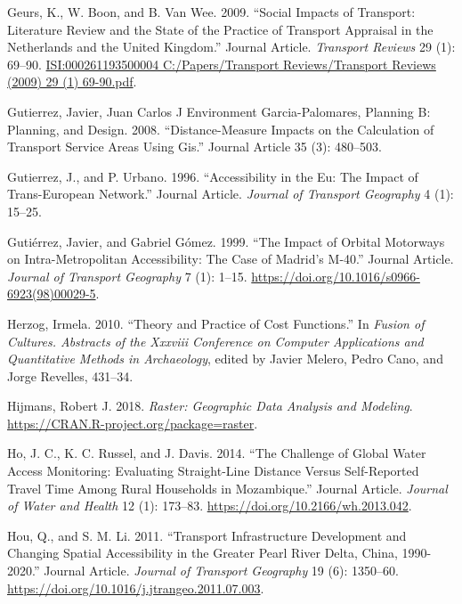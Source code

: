 \documentclass[]{elsarticle} %
\begin{document}
\leavevmode\hypertarget{ref-Geurs2009}{}%
Geurs, K., W. Boon, and B. Van Wee. 2009. ``Social Impacts of Transport:
Literature Review and the State of the Practice of Transport Appraisal
in the Netherlands and the United Kingdom.'' Journal Article.
\emph{Transport Reviews} 29 (1): 69--90.
\href{ISI:000261193500004\%0AC:/Papers/Transport\%20Reviews/Transport\%20Reviews\%20(2009)\%2029\%20(1)\%2069-90.pdf}{ISI:000261193500004
C:/Papers/Transport Reviews/Transport Reviews (2009) 29 (1) 69-90.pdf}.

\leavevmode\hypertarget{ref-Gutierrez2008}{}%
Gutierrez, Javier, Juan Carlos J Environment Garcia-Palomares, Planning
B: Planning, and Design. 2008. ``Distance-Measure Impacts on the
Calculation of Transport Service Areas Using Gis.'' Journal Article 35
(3): 480--503.

\leavevmode\hypertarget{ref-Gutierrez1996}{}%
Gutierrez, J., and P. Urbano. 1996. ``Accessibility in the Eu: The
Impact of Trans-European Network.'' Journal Article. \emph{Journal of
Transport Geography} 4 (1): 15--25.

\leavevmode\hypertarget{ref-Gutierrez1999impact}{}%
Gutiérrez, Javier, and Gabriel Gómez. 1999. ``The Impact of Orbital
Motorways on Intra-Metropolitan Accessibility: The Case of Madrid's
M-40.'' Journal Article. \emph{Journal of Transport Geography} 7 (1):
1--15. \url{https://doi.org/10.1016/s0966-6923(98)00029-5}.

\leavevmode\hypertarget{ref-Herzog2010theory}{}%
Herzog, Irmela. 2010. ``Theory and Practice of Cost Functions.'' In
\emph{Fusion of Cultures. Abstracts of the Xxxviii Conference on
Computer Applications and Quantitative Methods in Archaeology}, edited
by Javier Melero, Pedro Cano, and Jorge Revelles, 431--34.

\leavevmode\hypertarget{ref-Hijmans2018raster}{}%
Hijmans, Robert J. 2018. \emph{Raster: Geographic Data Analysis and
Modeling}. \url{https://CRAN.R-project.org/package=raster}.

\leavevmode\hypertarget{ref-Ho2014}{}%
Ho, J. C., K. C. Russel, and J. Davis. 2014. ``The Challenge of Global
Water Access Monitoring: Evaluating Straight-Line Distance Versus
Self-Reported Travel Time Among Rural Households in Mozambique.''
Journal Article. \emph{Journal of Water and Health} 12 (1): 173--83.
\url{https://doi.org/10.2166/wh.2013.042}.

\leavevmode\hypertarget{ref-Hou2011transport}{}%
Hou, Q., and S. M. Li. 2011. ``Transport Infrastructure Development and
Changing Spatial Accessibility in the Greater Pearl River Delta, China,
1990-2020.'' Journal Article. \emph{Journal of Transport Geography} 19
(6): 1350--60. \url{https://doi.org/10.1016/j.jtrangeo.2011.07.003}.
\end{document}
